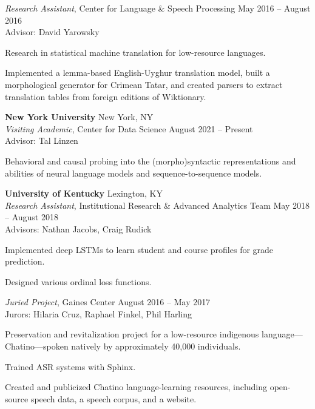 \documentclass[10pt]{article}
\newcommand{\halfblankline}{\quad\vspace{-0.5\baselineskip}\pagebreak[3]}
\begin{document}
		\halfblankline

		\textit{Research Assistant}, Center for Language \& Speech Processing
		\hfill May 2016 -- August 2016\\
		Advisor: David Yarowsky
		\begin{innerlist}
			\item Research in statistical machine translation for low-resource languages.
			\item Implemented a lemma-based English-Uyghur translation model, built a morphological generator for Crimean Tatar, and created parsers to extract translation tables from foreign editions of Wiktionary.
		\end{innerlist}
	
	\halfblankline

	{\textbf{New York University}}
	\hfill New York, NY\\
		\textit{Visiting Academic}, Center for Data Science
		\hfill August 2021 -- Present \\
		Advisor: Tal Linzen
		\begin{innerlist}
			\item Behavioral and causal probing into the (morpho)syntactic representations and abilities of neural language models and sequence-to-sequence models.
		\end{innerlist}

	\halfblankline

	{\textbf{University of Kentucky}}
	\hfill Lexington, KY\\
		\textit{Research Assistant}, Institutional Research \& Advanced Analytics Team
		\hfill May 2018 -- August 2018\\
		Advisors: Nathan Jacobs, Craig Rudick
		\begin{innerlist}
			\item Implemented deep LSTMs to learn student and course profiles for grade prediction.
			\item Designed various ordinal loss functions.
		\end{innerlist}

		\halfblankline
		
		\textit{Juried Project}, Gaines Center
		\hfill August 2016 -- May 2017\\
		Jurors: Hilaria Cruz, Raphael Finkel, Phil Harling
		\begin{innerlist}
			\item Preservation and revitalization project for a low-resource indigenous language---Chatino---spoken natively by approximately 40,000 individuals.
			\item Trained ASR systems with Sphinx.
			\item Created and publicized Chatino language-learning resources, including open-source speech data, a speech corpus, and a website.
		\end{innerlist}
\end{document}
